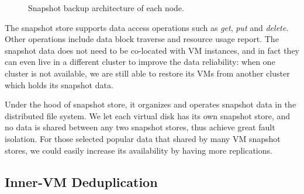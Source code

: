 \begin{figure}[htbp]
  \centering
  \caption{Snapshot backup architecture of each node.}
  \label{fig:arch}
\end{figure}

The snapshot store 
supports data access operations such as \emph{get}, \emph{put} and \emph{delete}.
Other operations include data block traverse and resource usage report.
The snapshot data does not need to be
co-located with VM instances, and in fact they can even live in a different cluster to improve the 
data reliability: when one cluster is not available, we are still able to restore its VMs from another cluster which
holds its snapshot data. 

Under the hood of snapshot store, it organizes and operates snapshot data 
in the distributed file system. We let each virtual disk has its own snapshot store, 
and no data is shared between
any two snapshot stores, thus achieve great fault isolation. For those selected popular data
that shared by many VM snapshot stores, we could easily increase its availability by having more replications.





\subsection{Inner-VM Deduplication}
\label{sect:innerVM}

